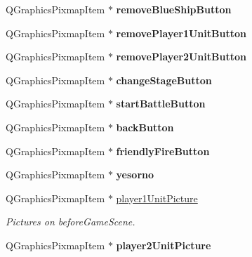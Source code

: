 \begin{DoxyCompactItemize}
\item 
Q\+Graphics\+Pixmap\+Item $\ast$ {\bfseries remove\+Blue\+Ship\+Button}\hypertarget{class_game_menu_a5291121c9137f0f5395dc907e0fab7d0}{}\label{class_game_menu_a5291121c9137f0f5395dc907e0fab7d0}

\item 
Q\+Graphics\+Pixmap\+Item $\ast$ {\bfseries remove\+Player1\+Unit\+Button}\hypertarget{class_game_menu_addbd2f8181f964d60fda59124bab548d}{}\label{class_game_menu_addbd2f8181f964d60fda59124bab548d}

\item 
Q\+Graphics\+Pixmap\+Item $\ast$ {\bfseries remove\+Player2\+Unit\+Button}\hypertarget{class_game_menu_ae4e2074109a89d582cb9e88e83f37a36}{}\label{class_game_menu_ae4e2074109a89d582cb9e88e83f37a36}

\item 
Q\+Graphics\+Pixmap\+Item $\ast$ {\bfseries change\+Stage\+Button}\hypertarget{class_game_menu_a7305ba1cbd36a0c0383968581977b66e}{}\label{class_game_menu_a7305ba1cbd36a0c0383968581977b66e}

\item 
Q\+Graphics\+Pixmap\+Item $\ast$ {\bfseries start\+Battle\+Button}\hypertarget{class_game_menu_a63e87ded92f5c386c776fdf0db70c391}{}\label{class_game_menu_a63e87ded92f5c386c776fdf0db70c391}

\item 
Q\+Graphics\+Pixmap\+Item $\ast$ {\bfseries back\+Button}\hypertarget{class_game_menu_a5095d622706253beec6b63056c09e872}{}\label{class_game_menu_a5095d622706253beec6b63056c09e872}

\item 
Q\+Graphics\+Pixmap\+Item $\ast$ {\bfseries friendly\+Fire\+Button}\hypertarget{class_game_menu_acbf50def7da8afa135d24e6a0f8a8a92}{}\label{class_game_menu_acbf50def7da8afa135d24e6a0f8a8a92}

\item 
Q\+Graphics\+Pixmap\+Item $\ast$ {\bfseries yesorno}\hypertarget{class_game_menu_ad650020a1b9c6076803203746289cca3}{}\label{class_game_menu_ad650020a1b9c6076803203746289cca3}

\item 
Q\+Graphics\+Pixmap\+Item $\ast$ \hyperlink{class_game_menu_a7b6ec049efa3d2edb073b0c6f8d4410c}{player1\+Unit\+Picture}\hypertarget{class_game_menu_a7b6ec049efa3d2edb073b0c6f8d4410c}{}\label{class_game_menu_a7b6ec049efa3d2edb073b0c6f8d4410c}

\begin{DoxyCompactList}\small\item\em Pictures on before\+Game\+Scene. \end{DoxyCompactList}\item 
Q\+Graphics\+Pixmap\+Item $\ast$ {\bfseries player2\+Unit\+Picture}\hypertarget{class_game_menu_af1854743b63b9756bfd6ce0761918e7e}{}\label{class_game_menu_af1854743b63b9756bfd6ce0761918e7e}


\end{DoxyCompactItemize}
